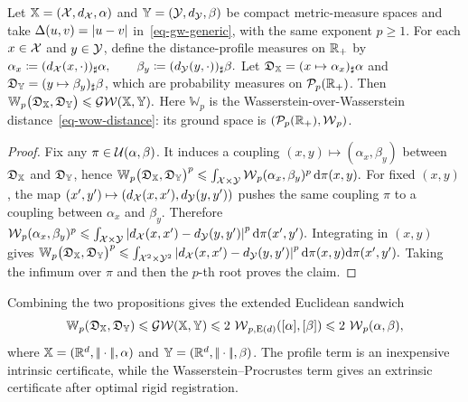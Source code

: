 \begin{prop}\label{prop-memoli-gw-profile-lower-bound}
Let $\mathbb{X}=(\mathcal{X},d_{\mathcal{X}},\alpha)$ and $\mathbb{Y}=(\mathcal{Y},d_{\mathcal{Y}},\beta)$ be compact metric-measure spaces and take $\Delta(u,v)=|u-v|$ in~\eqref{eq-gw-generic}, with the same exponent $p\geq1$. For each $x\in\mathcal{X}$ and $y\in\mathcal{Y}$, define the distance-profile measures on $\mathbb{R}_+$ by
\(\alpha_x\coloneqq(d_{\mathcal{X}}(x,\cdot))_\sharp\alpha, \qquad \beta_y\coloneqq(d_{\mathcal{Y}}(y,\cdot))_\sharp\beta.\)
Let $\mathfrak D_{\mathbb{X}}=(x\mapsto\alpha_x)_\sharp\alpha$ and $\mathfrak D_{\mathbb{Y}}=(y\mapsto\beta_y)_\sharp\beta$, which are probability measures on $\mathcal{P}_p(\mathbb{R}_+)$. Then
\(\mathbb W_p\bigl(\mathfrak D_{\mathbb{X}},\mathfrak D_{\mathbb{Y}}\bigr) \leqslant \operatorname{\mathcal{GW}}(\mathbb{X},\mathbb{Y}).\)
Here $\mathbb W_p$ is the Wasserstein-over-Wasserstein distance~\eqref{eq-wow-distance}: its ground space is $(\mathcal{P}_p(\mathbb{R}_+),\operatorname{\mathcal{W}}_p)$.
\end{prop}
\begin{proof}
Fix any $\pi\in\mathcal{U}(\alpha,\beta)$. It induces a coupling $(x,y)\mapsto(\alpha_x,\beta_y)$ between $\mathfrak D_{\mathbb{X}}$ and $\mathfrak D_{\mathbb{Y}}$, hence
\(\mathbb W_p\bigl(\mathfrak D_{\mathbb{X}},\mathfrak D_{\mathbb{Y}}\bigr)^p \leqslant \int_{\mathcal{X}\times\mathcal{Y}}\operatorname{\mathcal{W}}_p(\alpha_x,\beta_y)^p\,\mathrm{d}\pi(x,y).\)
For fixed $(x,y)$, the map $(x',y')\mapsto(d_{\mathcal{X}}(x,x'),d_{\mathcal{Y}}(y,y'))$ pushes the same coupling $\pi$ to a coupling between $\alpha_x$ and $\beta_y$. Therefore
\(\operatorname{\mathcal{W}}_p(\alpha_x,\beta_y)^p \leqslant \int_{\mathcal{X}\times\mathcal{Y}} \left\lvert d_{\mathcal{X}}(x,x')-d_{\mathcal{Y}}(y,y')\right\rvert^p \mathrm{d}\pi(x',y').\)
Integrating in $(x,y)$ gives \(\mathbb W_p\bigl(\mathfrak D_{\mathbb{X}},\mathfrak D_{\mathbb{Y}}\bigr)^p \leqslant \int_{\mathcal{X}^2\times\mathcal{Y}^2} \left\lvert d_{\mathcal{X}}(x,x')-d_{\mathcal{Y}}(y,y')\right\rvert^p \mathrm{d}\pi(x,y)\mathrm{d}\pi(x',y').\)
Taking the infimum over $\pi$ and then the $p$-th root proves the claim.
\end{proof}
Combining the two propositions gives the extended Euclidean sandwich
\begin{equation}\label{eq-gw-profile-procrustes-sandwich}
\mathbb W_p(\mathfrak D_{\mathbb{X}},\mathfrak D_{\mathbb{Y}})
\leqslant
\operatorname{\mathcal{GW}}(\mathbb{X},\mathbb{Y})
\leqslant
2\,\operatorname{\mathcal{W}}_{p,\mathrm E(d)}([\alpha],[\beta])
\leqslant
2\,\operatorname{\mathcal{W}}_p(\alpha,\beta),
\end{equation}
where $\mathbb{X}=(\mathbb{R}^d,|\!| \cdot |\!|,\alpha)$ and $\mathbb{Y}=(\mathbb{R}^d,|\!| \cdot |\!|,\beta)$. The profile term is an inexpensive intrinsic certificate, while the Wasserstein--Procrustes term gives an extrinsic certificate after optimal rigid registration.

